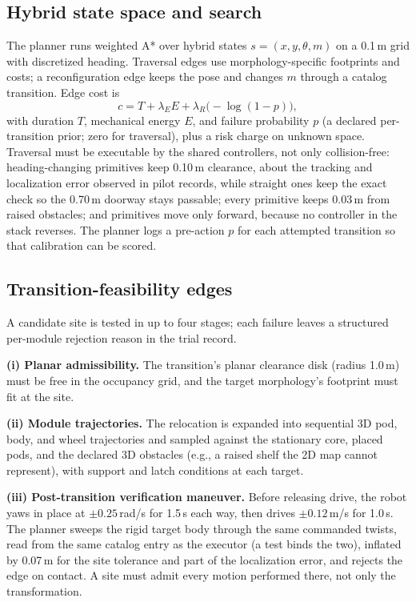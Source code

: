 \documentclass[conference]{IEEEtran}
\begin{document}
\subsection{Hybrid state space and search}
The planner runs weighted A* over hybrid states $s = (x, y, \theta, m)$ on a 0.1\,m grid with discretized heading. Traversal edges use morphology-specific footprints and costs; a reconfiguration edge keeps the pose and changes $m$ through a catalog transition. Edge cost is
\begin{equation}
c = T + \lambda_E E + \lambda_R \bigl(-\log(1 - p)\bigr),
\end{equation}
with duration $T$, mechanical energy $E$, and failure probability $p$ (a declared per-transition prior; zero for traversal), plus a risk charge on unknown space. Traversal must be executable by the shared controllers, not only collision-free: heading-changing primitives keep 0.10\,m clearance, about the tracking and localization error observed in pilot records, while straight ones keep the exact check so the 0.70\,m doorway stays passable; every primitive keeps 0.03\,m from raised obstacles; and primitives move only forward, because no controller in the stack reverses. The planner logs a pre-action $p$ for each attempted transition so that calibration can be scored.

\subsection{Transition-feasibility edges}
A candidate site is tested in up to four stages; each failure leaves a structured per-module rejection reason in the trial record.

\textbf{(i) Planar admissibility.} The transition's planar clearance disk (radius 1.0\,m) must be free in the occupancy grid, and the target morphology's footprint must fit at the site.

\textbf{(ii) Module trajectories.} The relocation is expanded into sequential 3D pod, body, and wheel trajectories and sampled against the stationary core, placed pods, and the declared 3D obstacles (e.g., a raised shelf the 2D map cannot represent), with support and latch conditions at each target.

\textbf{(iii) Post-transition verification maneuver.} Before releasing drive, the robot yaws in place at $\pm 0.25$\,rad/s for 1.5\,s each way, then drives $\pm 0.12$\,m/s for 1.0\,s. The planner sweeps the rigid target body through the same commanded twists, read from the same catalog entry as the executor (a test binds the two), inflated by 0.07\,m for the site tolerance and part of the localization error, and rejects the edge on contact. A site must admit every motion performed there, not only the transformation.
\end{document}
